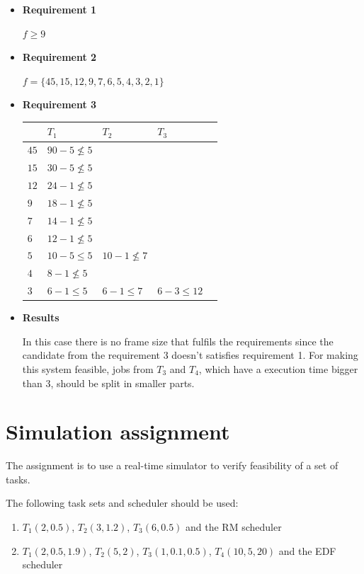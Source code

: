\documentclass[12pt]{article}
\begin{document}
\begin{itemize}

\item \textbf{Requirement 1}

$f\geq9$

\item \textbf{Requirement 2}

$f=\{45,15,12,9,7,6,5,4,3,2,1\}$

\item \textbf{Requirement 3}

\begin{tabular}{ l | l l l l }
   & $T_{1}$ & $T_{2}$ & $T_{3}$ \\ \hline
  $45$ & $90 - 5 \nleq 5$ & & & \\
  $15$ & $30 - 5 \nleq 5$ & & & \\
  $12$ & $24 - 1 \nleq 5$ & & & \\
  $9$ & $18 - 1 \nleq 5$ & & & \\
  $7$ & $14 - 1 \nleq 5$ & & & \\
  $6$ & $12 - 1 \nleq 5$ & & & \\
  $5$ & $10 - 5 \leq 5$ & $10 - 1 \nleq 7$ & & \\
  $4$ & $8 - 1 \nleq 5$ & & \\
  $3$ & $6 - 1 \leq 5$ & $6 - 1 \leq 7$ & $6 - 3 \leq 12$ \\

\end{tabular}


\item \textbf{Results}


In this case there is no frame size that fulfils the requirements since the candidate from the requirement 3 doesn't satisfies requirement 1. For making this system feasible, jobs from $T_{3}$ and $T_{4}$, which have a execution time bigger than 3, should be split in smaller parts.

\end{itemize}

\section{Simulation assignment}

The assignment is to use a real-time simulator to verify feasibility of a set of tasks.

The following task sets and scheduler should be used:

\begin{enumerate}
\item $T_{1}(2, 0.5)$, $T_{2}(3, 1.2)$, $T_{3}(6, 0.5)$ and the RM scheduler 
\item $T_{1}(2, 0.5, 1.9)$, $T_{2}(5, 2)$, $T_{3}(1, 0.1, 0.5)$, $T_{4}(10, 5, 20)$ and the EDF scheduler
\end{enumerate}
\end{document}
